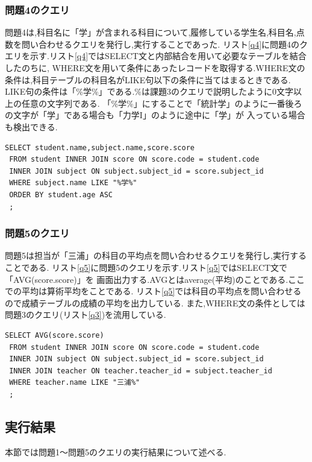 \documentclass[a4j]{jarticle}
\begin{document}
    \subsubsection{問題4のクエリ}
    問題4は,科目名に「学」が含まれる科目について,履修している学生名,科目名,点数を問い合わせるクエリを発行し,実行することであった.
    リスト\ref{q4}に問題4のクエリを示す.リスト\ref{q4}ではSELECT文と内部結合を用いて必要なテーブルを結合したのちに,
    WHERE文を用いて条件にあったレコードを取得する.WHERE文の条件は,科目テーブルの科目名がLIKE句以下の条件に当てはまるときである.
    LIKE句の条件は「\%学\%」である.\%は課題3のクエリで説明したように0文字以上の任意の文字列である.
    「\%学\%」にすることで「統計学」のように一番後ろの文字が「学」である場合も「力学I」のように途中に「学」が
    入っている場合も検出できる.
    \begin{lstlisting}[basicstyle=\ttfamily\footnotesize, frame=single,label=q4,caption=問題4のクエリ]
 SELECT student.name,subject.name,score.score
 FROM student INNER JOIN score ON score.code = student.code
 INNER JOIN subject ON subject.subject_id = score.subject_id 
 WHERE subject.name LIKE "%学%"
 ORDER BY student.age ASC
 ;
          \end{lstlisting}

    \subsubsection{問題5のクエリ}
    問題5は担当が「三浦」の科目の平均点を問い合わせるクエリを発行し,実行することである.
    リスト\ref{q5}に問題5のクエリを示す.リスト\ref{q5}ではSELECT文で「AVG(score.score)」を
    画面出力する.AVGとはaverage(平均)のことである.ここでの平均は算術平均をことである.
    リスト\ref{q5}では科目の平均点を問い合わせるので成績テーブルの成績の平均を出力している.
    また,WHERE文の条件としては問題3のクエリ(リスト\ref{q3})を流用している.
        \begin{lstlisting}[basicstyle=\ttfamily\footnotesize, frame=single,label=q5,caption=問題5のクエリ]
 SELECT AVG(score.score)
 FROM student INNER JOIN score ON score.code = student.code
 INNER JOIN subject ON subject.subject_id = score.subject_id 
 INNER JOIN teacher ON teacher.teacher_id = subject.teacher_id
 WHERE teacher.name LIKE "三浦%"
 ;
          \end{lstlisting}


    \subsection{実行結果}
    本節では問題1～問題5のクエリの実行結果について述べる.
\end{document}
